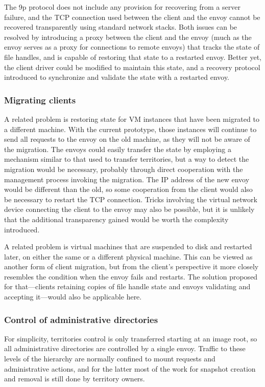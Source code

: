 The 9p protocol does not include any provision for recovering from a server failure, and the TCP connection used between the client and the envoy cannot be recovered transparently using standard network stacks. Both issues can be resolved by introducing a proxy between the client and the envoy (much as the envoy serves as a proxy for connections to remote envoys) that tracks the state of file handles, and is capable of restoring that state to a restarted envoy. Better yet, the client driver could be modified to maintain this state, and a recovery protocol introduced to synchronize and validate the state with a restarted envoy.

\subsubsection{Migrating clients}

A related problem is restoring state for VM instances that have been migrated to a different machine. With the current prototype, those instances will continue to send all requests to the envoy on the old machine, as they will not be aware of the migration. The envoys could easily transfer the state by employing a mechanism similar to that used to transfer territories, but a way to detect the migration would be necessary, probably through direct cooperation with the management process invoking the migration. The IP address of the new envoy would be different than the old, so some cooperation from the client would also be necessary to restart the TCP connection. Tricks involving the virtual network device connecting the client to the envoy may also be possible, but it is unlikely that the additional transparency gained would be worth the complexity introduced.

A related problem is virtual machines that are suspended to disk and restarted later, on either the same or a different physical machine. This can be viewed as another form of client migration, but from the client's perspective it more closely resembles the condition when the envoy fails and restarts. The solution proposed for that---clients retaining copies of file handle state and envoys validating and accepting it---would also be applicable here.

\subsubsection{Control of administrative directories}

For simplicity, territories control is only transferred starting at an image root, so all administrative directories are controlled by a single envoy. Traffic to these levels of the hierarchy are normally confined to mount requests and administrative actions, and for the latter most of the work for snapshot creation and removal is still done by territory owners.

